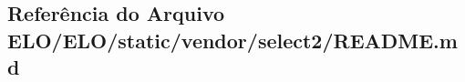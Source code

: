 \hypertarget{ELO_2ELO_2static_2vendor_2select2_2README_8md}{\subsection{Referência do Arquivo E\-L\-O/\-E\-L\-O/static/vendor/select2/\-R\-E\-A\-D\-M\-E.md}
\label{ELO_2ELO_2static_2vendor_2select2_2README_8md}
}
